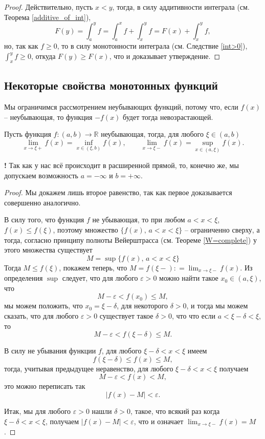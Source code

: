 \begin{proof}
 Действительно, пусть $x<y$, тогда, в силу аддитивности интеграла (см. Теорема \ref{additive_of_int}), 
 \[
  F(y) = \int_a^y f = \int_a^x f + \int_x^y f = F(x) + \int_x^y f , 
 \]
 но, так как $f \ge 0$, то в силу монотонности интеграла (см. Следствие \ref{int>0}), $\int_x^y f \ge 0$, откуда $F(y) \ge F(x)$, что и доказывает утверждение.
\end{proof}


\subsection{Некоторые свойства монотонных функций}

Мы ограничимся рассмотрением неубывающих функций, потому что, если $f(x)$ -- неубывающая, то функция $-f(x)$ будет тогда невозрастающей.


\begin{theorem}\label{about_monotonic}
 Пусть функция $f:(a,b) \to \mathbb{R}$ неубывающая, тогда, для любого $\xi \in (a,b)$
 \[
  \lim_{x \to \xi+}f(x) = \inf_{x \in (\xi, b)} f(x), \qquad \lim_{x\to \xi - }f(x) = \sup_{x \in (a,\xi)} f(x).
 \]
\end{theorem}
\begin{mydangerr}{\bf !}
    Так как у нас всё происходит в расширенной прямой, то, конечно же, мы допускаем возможность $a = - \infty$ и $b = + \infty.$
\end{mydangerr}

\begin{proof}
 Мы докажем лишь второе равенство, так как первое доказывается совершенно аналогично.

 В силу того, что функция $f$ не убывающая, то при любом $a < x < \xi$, $f(x) \le f(\xi)$, поэтому множество $\{f(x),\, a < x < \xi\}$ -- ограниченно сверху, а тогда, согласно принципу полноты Вейерштрасса (см. Теореме \ref{W=complete}) у этого множества существует 
    \[
    M= \sup \{f(x),\, a < x < \xi\}
    \]
Тогда $M \le f(\xi)$, покажем теперь, что $M = f(\xi-): = \lim_{x\to \xi - }f(x).$ Из определения $\sup$ следует, что для любого $\varepsilon>0$ можно найти такое $x_0\in (a ,\xi)$, что 
\[
 M-\varepsilon < f(x_0) \le M,
\]
мы можем положить, что $x_0 = \xi - \delta$, для некоторого $\delta>0$, и тогда мы можем сказать, что для любого $\varepsilon>0$ существует такое $\delta >0$, что что если $a <\xi-\delta <\xi$, то
\[
 M-\varepsilon < f(\xi  - \delta) \le M.
\]

В силу не убывания функции $f$, для любого $\xi - \delta <x <\xi$ имеем
\[
 f(\xi - \delta ) \le f(x) \le M,
\]
тогда, учитывая предыдущее неравенство,  для любого $\xi - \delta <x <\xi$ получаем
\[
 M - \varepsilon < f(x) < M,
\]
это можно переписать так
\[
 |f(x) - M| < \varepsilon.
\]

Итак, мы для любого $\varepsilon>0$ нашли $\delta >0$, такое, что всякий раз когда $\xi-\delta < x < \xi$, получаем $|f(x) - M| < \varepsilon$, что и означает $\lim_{x \to \xi-}f(x) = M$.
\end{proof}

